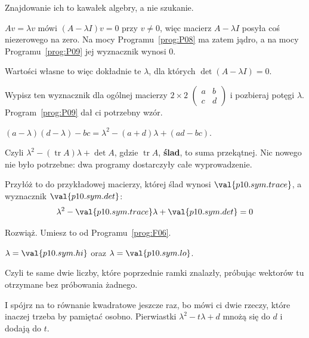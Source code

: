 \begin{fr}
Znajdowanie ich to kawałek algebry, a nie szukanie.

$Av = \lambda v$ mówi $(A - \lambda I)v = 0$ przy $v \ne 0$, więc macierz
$A - \lambda I$ posyła coś niezerowego na zero. Na mocy
Programu~\ref{prog:P08} ma zatem jądro, a na mocy Programu~\ref{prog:P09} jej
wyznacznik wynosi $0$.

Wartości własne to więc dokładnie te $\lambda$, dla których
$\det(A - \lambda I) = 0$.

Wypisz ten wyznacznik dla ogólnej macierzy $2 \times 2$
$\begin{pmatrix} a & b \\ c & d \end{pmatrix}$ i pozbieraj potęgi $\lambda$.
Program~\ref{prog:P09} dał ci potrzebny wzór.
\dotline
\nextframe
\end{fr}

\begin{fr}
\begin{ansblock}
$(a - \lambda)(d - \lambda) - bc = \lambda^{2} - (a + d)\lambda + (ad - bc)$.
\end{ansblock}

Czyli $\lambda^{2} - (\operatorname{tr}A)\lambda + \det A$, gdzie
$\operatorname{tr}A$, \textbf{ślad}, to suma przekątnej. Nic nowego nie było
potrzebne: dwa programy dostarczyły całe wyprowadzenie.

Przyłóż to do przykładowej macierzy, której ślad wynosi $\val{p10.sym.trace}$,
a wyznacznik $\val{p10.sym.det}$:
\[ \lambda^{2} - \val{p10.sym.trace}\lambda + \val{p10.sym.det} = 0 \]

Rozwiąż. Umiesz to od Programu~\ref{prog:F06}.
\dotline
\nextframe
\end{fr}

\begin{fr}
\begin{ansblock}
$\lambda = \val{p10.sym.hi}$ oraz $\lambda = \val{p10.sym.lo}$.
\end{ansblock}

Czyli te same dwie liczby, które poprzednie ramki znalazły, próbując wektorów
\dash{} tu otrzymane bez próbowania żadnego.

I spójrz na to równanie kwadratowe jeszcze raz, bo mówi ci dwie rzeczy, które
inaczej trzeba by pamiętać osobno. Pierwiastki $\lambda^{2} - t\lambda + d$
mnożą się do $d$ i dodają do $t$.
\end{fr}

